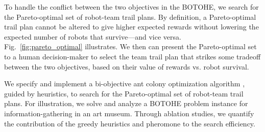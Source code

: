 \documentclass[fleqn,10pt,lineno]{wlpeerj}
\begin{document}
To handle the conflict between the two objectives in the BOTOHE, we search for the Pareto-optimal set \cite{pardalos2017non,branke2008multiobjective} of robot-team trail plans. By definition, a Pareto-optimal trail plan cannot be altered to give higher expected rewards without lowering the expected number of robots that survive---and vice versa. 
Fig.~\ref{fig:pareto_optimal} illustrates.
We then can present the Pareto-optimal set to a human decision-maker to select the team trail plan that strikes some tradeoff between the two objectives, based on their value of rewards vs. robot survival. 

We specify and implement a bi-objective ant colony optimization algorithm \cite{iredi2001bi}, guided by heuristics, to search for the Pareto-optimal set of robot-team trail plans.
For illustration, we solve and analyze a BOTOHE problem instance for information-gathering in an art museum.
Through ablation studies, we quantify the contribution of the greedy heuristics and pheromone to the search efficiency.
\end{document}
